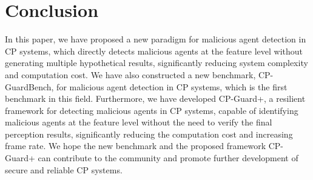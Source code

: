 
\section{Conclusion}

In this paper, we have proposed a new paradigm for malicious agent detection in CP systems, which directly detects malicious agents at the feature level without generating multiple hypothetical results, significantly reducing system complexity and computation cost. 
We have also constructed a new benchmark, CP-GuardBench, for malicious agent detection in CP systems, which is the first benchmark in this field. 
Furthermore, we have developed CP-Guard+, a resilient framework for detecting malicious agents in CP systems, capable of identifying malicious agents at the feature level without the need to verify the final perception results, significantly reducing the computation cost and increasing frame rate. We hope the new benchmark and the proposed framework CP-Guard+ can contribute to the community and promote further development of secure and reliable CP systems.






